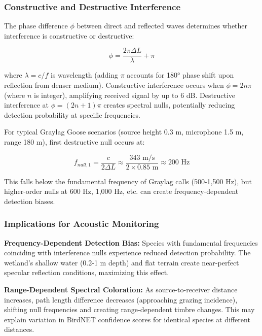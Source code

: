 \documentclass[twocolumn]{article}
\begin{document}
\subsubsection{Constructive and Destructive Interference}

The phase difference $\phi$ between direct and reflected waves determines whether interference is constructive or destructive:

\begin{equation}
\phi = \frac{2\pi \Delta L}{\lambda} + \pi
\end{equation}

where $\lambda = c/f$ is wavelength (adding $\pi$ accounts for 180° phase shift upon reflection from denser medium). Constructive interference occurs when $\phi = 2n\pi$ (where $n$ is integer), amplifying received signal by up to 6 dB. Destructive interference at $\phi = (2n+1)\pi$ creates spectral nulls, potentially reducing detection probability at specific frequencies.

For typical Graylag Goose scenarios (source height 0.3 m, microphone 1.5 m, range 180 m), first destructive null occurs at:

\begin{equation}
f_{null,1} = \frac{c}{2\Delta L} \approx \frac{343 \text{ m/s}}{2 \times 0.85 \text{ m}} \approx 200 \text{ Hz}
\end{equation}

This falls below the fundamental frequency of Graylag calls (500-1,500 Hz), but higher-order nulls at 600 Hz, 1,000 Hz, etc. can create frequency-dependent detection biases.

\subsubsection{Implications for Acoustic Monitoring}

\textbf{Frequency-Dependent Detection Bias:} Species with fundamental frequencies coinciding with interference nulls experience reduced detection probability. The wetland's shallow water (0.2-1 m depth) and flat terrain create near-perfect specular reflection conditions, maximizing this effect.

\textbf{Range-Dependent Spectral Coloration:} As source-to-receiver distance increases, path length difference decreases (approaching grazing incidence), shifting null frequencies and creating range-dependent timbre changes. This may explain variation in BirdNET confidence scores for identical species at different distances.
\end{document}
